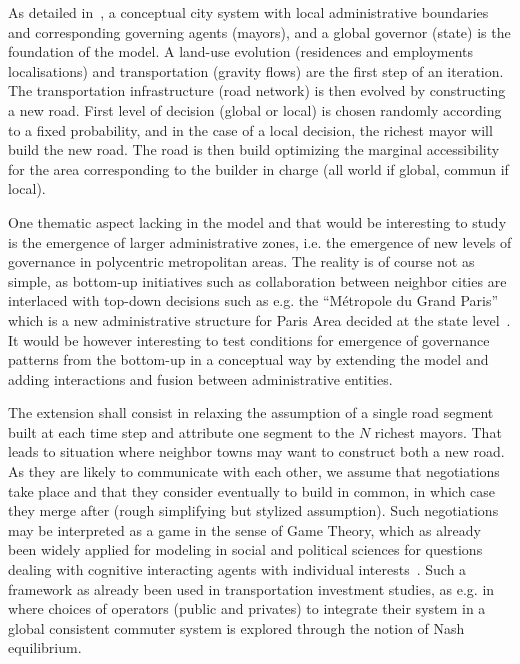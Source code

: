As detailed in~\cite{lenechet2012}, a conceptual city system with local administrative boundaries and corresponding governing agents (mayors), and a global governor (state) is the foundation of the model. A land-use evolution (residences and employments localisations) and transportation (gravity flows) are the first step of an iteration. The transportation infrastructure (road network) is then evolved by constructing a new road. First level of decision (global or local) is chosen randomly according to a fixed probability, and in the case of a local decision, the richest mayor will build the new road. The road is then build optimizing the marginal accessibility for the area corresponding to the builder in charge (all world if global, commun if local).

One thematic aspect lacking in the model and that would be interesting to study is the emergence of larger administrative zones, i.e. the emergence of new levels of governance in polycentric metropolitan areas. The reality is of course not as simple, as bottom-up initiatives such as collaboration between neighbor cities are interlaced with top-down decisions such as e.g. the ``M{\'e}tropole du Grand Paris'' which is a new administrative structure for Paris Area decided at the state level~\cite{gilli2009paris}. It would be however interesting to test conditions for emergence of governance patterns from the bottom-up in a conceptual way by extending the model and adding interactions and fusion between administrative entities.

The extension shall consist in relaxing the assumption of a single road segment built at each time step and attribute one segment to the $N$ richest mayors. That leads to situation where neighbor towns may want to construct both a new road. As they are likely to communicate with each other, we assume that negotiations take place and that they consider eventually to build in common, in which case they merge after (rough simplifying but stylized assumption). Such negotiations may be interpreted as a game in the sense of Game Theory, which as already been widely applied for modeling in social and political sciences for questions dealing with cognitive interacting agents with individual interests~\cite{ordeshook1986game}. Such a framework as already been used in transportation investment studies, as e.g. in~\cite{Roumboutsos2008209} where choices of operators (public and privates) to integrate their system in a global consistent commuter system is explored through the notion of Nash equilibrium.




